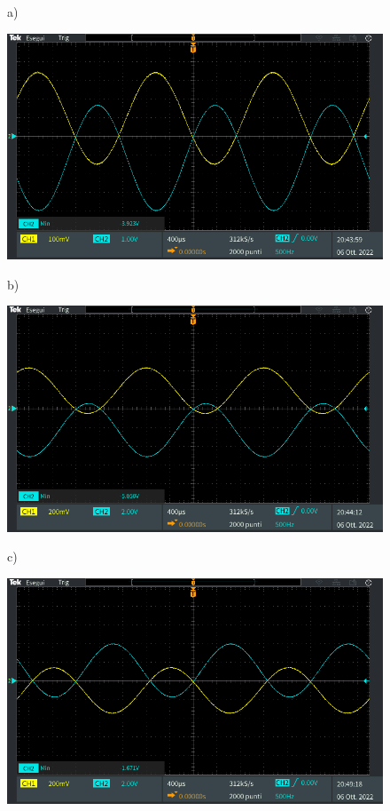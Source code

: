 \begin{figure}[h]
	\centering
	a)
	
	\includegraphics[width=0.8\linewidth]{./ImageFiles/Laboratorio 1/TEK00012}	
\end{figure}
\begin{figure}[h]
	\centering
	b)
	
	\includegraphics[width=0.8\linewidth]{./ImageFiles/Laboratorio 1/TEK00013}
\end{figure}
\begin{figure}[h]
	\centering
	c)
	
	\includegraphics[width=0.8\linewidth]{./ImageFiles/Laboratorio 1/TEK00014}
\end{figure}
